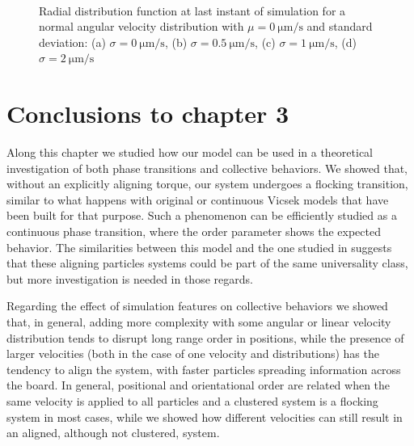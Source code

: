 \documentclass[../../master_thesis_np.tex]{subfiles}
\begin{document}
		\begin{figure}[t]
		\centering
		\ContinuedFloat
			\\
			
			\caption{Radial distribution function at last instant of simulation for a normal angular velocity distribution with $\mu = \SI{0}{\um\per\second}$ and standard deviation: (a) $\sigma = \SI{0}{\um\per\second}$, (b) $\sigma = \SI{0.5}{\um\per\second}$, (c) $\sigma = \SI{1}{\um\per\second}$, (d) $\sigma = \SI{2}{\um\per\second}$}
			\label{fig:lj_av_rdf}
		\end{figure}
		
    \section{Conclusions to chapter 3}
    \label{3concl}
    Along this chapter we studied how our model can be used in a theoretical investigation of both phase transitions and collective behaviors.
    We showed that, without an explicitly aligning torque, our system undergoes a flocking transition, similar to what happens with original or continuous Vicsek models that have been built for that purpose.
    Such a phenomenon can be efficiently studied as a continuous phase transition, where the order parameter shows the expected behavior.
    The similarities between this model and the one studied in \cite{martin-gomez_collective_2018} suggests that these aligning particles systems could be part of the same universality class, but more investigation is needed in those regards.
    
    Regarding the effect of simulation features on collective behaviors we showed that, in general, adding more complexity with some angular or linear velocity distribution tends to disrupt long range order in positions, while the presence of larger velocities (both in the case of one velocity and distributions) has the tendency to align the system, with faster particles spreading information across the board.
    In general, positional and orientational order are related when the same velocity is applied to all particles and a clustered system is a flocking system in most cases, while we showed how different velocities can still result in an aligned, although not clustered, system.
    
\end{document}
